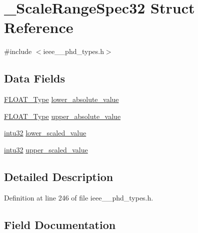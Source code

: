 \hypertarget{struct___scale_range_spec32}{}\section{\+\_\+\+Scale\+Range\+Spec32 Struct Reference}
\label{struct___scale_range_spec32}


{\ttfamily \#include $<$ieee\+\_\+\_\+phd\+\_\+types.\+h$>$}

\subsection*{Data Fields}
\begin{DoxyCompactItemize}
\item 
\hyperlink{ieee__11073__phd__types_8h_af070130e724f8e6babaa500f89591392}{F\+L\+O\+A\+T\+\_\+\+Type} \hyperlink{struct___scale_range_spec32_a76e8282bddb1102f4d0eba8c6495c0dd}{lower\+\_\+absolute\+\_\+value}
\item 
\hyperlink{ieee__11073__phd__types_8h_af070130e724f8e6babaa500f89591392}{F\+L\+O\+A\+T\+\_\+\+Type} \hyperlink{struct___scale_range_spec32_a277c28db15b66bc84d310a9d82c73ad1}{upper\+\_\+absolute\+\_\+value}
\item 
\hyperlink{ieee__11073__phd__types_8h_a22fd02d9fb90b079261a56b300e7f3c1}{intu32} \hyperlink{struct___scale_range_spec32_a82e85b970a25689bdd253e6457fdc9aa}{lower\+\_\+scaled\+\_\+value}
\item 
\hyperlink{ieee__11073__phd__types_8h_a22fd02d9fb90b079261a56b300e7f3c1}{intu32} \hyperlink{struct___scale_range_spec32_a33bdc03f8f4b2cc2c9c92a7e24c56302}{upper\+\_\+scaled\+\_\+value}
\end{DoxyCompactItemize}


\subsection{Detailed Description}


Definition at line 246 of file ieee\+\_\+\_\+phd\+\_\+types.\+h.



\subsection{Field Documentation}
\hypertarget{struct___scale_range_spec32_a76e8282bddb1102f4d0eba8c6495c0dd}{}
